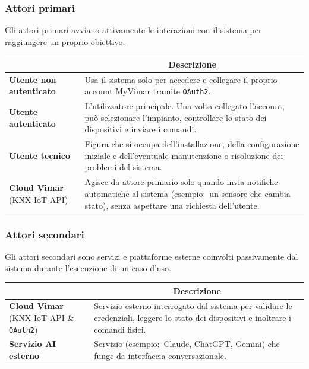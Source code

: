 \documentclass[11pt, a4paper]{article}
\begin{document}
\subsubsection{Attori primari}
Gli attori primari avviano attivamente le interazioni con il sistema per raggiungere un proprio obiettivo.

\vspace{0.3cm}
\begin{center}
    \renewcommand{\arraystretch}{1.5}
    \begin{tabularx}{\textwidth}{|l|X|}
        \hline
        \rowcolor{gray!10} 
        \multicolumn{1}{|c|}{\textbf{Attore}} & 
        \multicolumn{1}{c|}{\textbf{Descrizione}} \\
        \hline
        \textbf{Utente non autenticato} & Usa il sistema solo per accedere e collegare il proprio account MyVimar tramite \texttt{OAuth2}. \\
        \hline
        \textbf{Utente autenticato} & L'utilizzatore principale. Una volta collegato l'account, può selezionare l'impianto, controllare lo stato dei dispositivi e inviare i comandi. \\
        \hline
        \textbf{Utente tecnico} & Figura che si occupa dell'installazione, della configurazione iniziale e dell'eventuale manutenzione o risoluzione dei problemi del sistema. \\
        \hline
        \textbf{Cloud Vimar} (KNX IoT API) & Agisce da attore primario solo quando invia notifiche automatiche al sistema (esempio:\ un sensore che cambia stato), senza aspettare una richiesta dell'utente. \\
        \hline
    \end{tabularx}
\end{center}
 
\subsubsection{Attori secondari}
Gli attori secondari sono servizi e piattaforme esterne coinvolti passivamente dal sistema durante l'esecuzione di un caso d'uso.

\vspace{0.3cm}
\begin{center}
    \renewcommand{\arraystretch}{1.5}
    \begin{tabularx}{\textwidth}{|l|X|}
        \hline
        \rowcolor{gray!10} 
        \multicolumn{1}{|c|}{\textbf{Attore}} & 
        \multicolumn{1}{c|}{\textbf{Descrizione}} \\
        \hline
        \textbf{Cloud Vimar} (KNX IoT API \& \texttt{OAuth2}) & Servizio esterno interrogato dal sistema per validare le credenziali, leggere lo stato dei dispositivi e inoltrare i comandi fisici. \\
        \hline
        \textbf{Servizio AI esterno} & Servizio (esempio:\ Claude, ChatGPT, Gemini) che funge da interfaccia conversazionale. \\
        \hline
    \end{tabularx}
\end{center}
\end{document}
